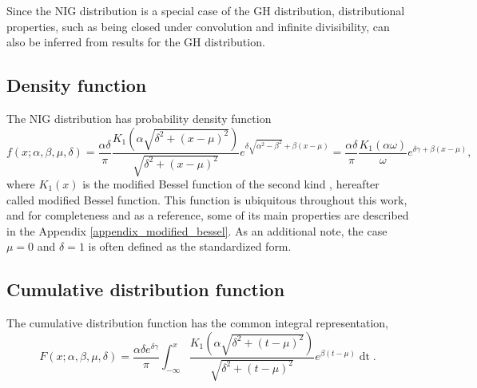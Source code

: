 \documentclass[10pt,a4paper,oneside]{article}
\numberwithin{equation}{section}
\begin{document}
Since the NIG distribution is a special case of the GH distribution, distributional properties, such as being closed under convolution and infinite divisibility, can also be inferred from results for the GH distribution.


\subsection{Density function}
The NIG distribution has probability density function
\begin{equation}
f(x; \alpha, \beta, \mu, \delta) = \frac{\alpha \delta}{\pi} \frac{K_1\left(\alpha\sqrt{\delta^2 + (x-\mu)^2}\right)}{\sqrt{\delta^2 + (x-\mu)^2}} e^{\delta \sqrt{\alpha^2 - \beta^2} + \beta(x-\mu)} = \frac{\alpha \delta}{\pi} \frac{K_1\left(\alpha\omega\right)}{\omega} e^{\delta \gamma + \beta(x-\mu)},
\end{equation}
where $K_1(x)$ is the modified Bessel function of the second kind \cite[\S 10]{NIST:DLMF},  hereafter called modified Bessel function. This function is ubiquitous throughout this work, and for completeness and as a reference, some of its main properties are described in the Appendix \ref{appendix_modified_bessel}. As an additional note, the case $\mu = 0$ and $\delta = 1$ is often defined as the standardized form.

\subsection{Cumulative distribution function}\label{properties_cdf}
The cumulative distribution function has the common integral representation,
\begin{equation}\label{integral_k1}
F(x; \alpha, \beta, \mu, \delta) = \frac{\alpha \delta e^{\delta \gamma}}{\pi} \int_{-\infty}^{x} \frac{K_1\left(\alpha\sqrt{\delta^2 + (t-\mu)^2}\right)}{\sqrt{\delta^2 + (t-\mu)^2}} e^{\beta(t-\mu)} \mathop{dt}.
\end{equation}
\end{document}
